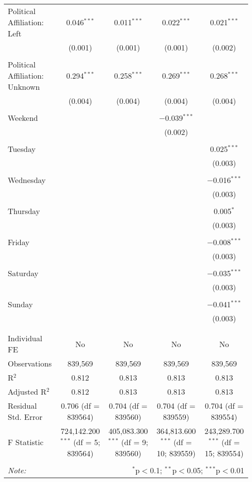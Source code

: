 \documentclass[
]{article}
\begin{document}
\begin{table}[!htbp]
{\begin{tabular}{@{\extracolsep{5pt}}lcccc}
 Political Affiliation: Left & 0.046$^{***}$ & 0.011$^{***}$ & 0.022$^{***}$ & 0.021$^{***}$ \\ 
  & (0.001) & (0.001) & (0.001) & (0.002) \\ 
  & & & & \\ 
 Political Affiliation: Unknown & 0.294$^{***}$ & 0.258$^{***}$ & 0.269$^{***}$ & 0.268$^{***}$ \\ 
  & (0.004) & (0.004) & (0.004) & (0.004) \\ 
  & & & & \\ 
 Weekend &  &  & $-$0.039$^{***}$ &  \\ 
  &  &  & (0.002) &  \\ 
  & & & & \\ 
 Tuesday &  &  &  & 0.025$^{***}$ \\ 
  &  &  &  & (0.003) \\ 
  & & & & \\ 
 Wednesday &  &  &  & $-$0.016$^{***}$ \\ 
  &  &  &  & (0.003) \\ 
  & & & & \\ 
 Thursday &  &  &  & 0.005$^{*}$ \\ 
  &  &  &  & (0.003) \\ 
  & & & & \\ 
 Friday &  &  &  & $-$0.008$^{***}$ \\ 
  &  &  &  & (0.003) \\ 
  & & & & \\ 
 Saturday &  &  &  & $-$0.035$^{***}$ \\ 
  &  &  &  & (0.003) \\ 
  & & & & \\ 
 Sunday &  &  &  & $-$0.041$^{***}$ \\ 
  &  &  &  & (0.003) \\ 
  & & & & \\ 
\hline \\[-1.8ex] 
Individual FE & No & No & No & No \\ 
Observations & 839,569 & 839,569 & 839,569 & 839,569 \\ 
R$^{2}$ & 0.812 & 0.813 & 0.813 & 0.813 \\ 
Adjusted R$^{2}$ & 0.812 & 0.813 & 0.813 & 0.813 \\ 
Residual Std. Error & 0.706 (df = 839564) & 0.704 (df = 839560) & 0.704 (df = 839559) & 0.704 (df = 839554) \\ 
F Statistic & 724,142.200$^{***}$ (df = 5; 839564) & 405,083.300$^{***}$ (df = 9; 839560) & 364,813.600$^{***}$ (df = 10; 839559) & 243,289.700$^{***}$ (df = 15; 839554) \\ 
\hline 
\hline \\[-1.8ex] 
\textit{Note:}  & \multicolumn{4}{r}{$^{*}$p$<$0.1; $^{**}$p$<$0.05; $^{***}$p$<$0.01} \\ 
\end{tabular}
} 
\end{table} 
\newpage
\end{document}
